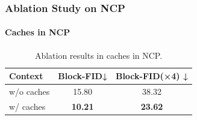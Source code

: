 \documentclass{article}
\begin{document}


\subsubsection{Ablation Study on NCP}

\paragraph{Caches in NCP}
\begin{table}
\vspace{-0.16in}
\centering
\setlength{\tabcolsep}{2pt}
\begin{tabular}{lcc}
\toprule
Context      & Block-FID↓ & Block-FID(×4) ↓ \\ 
\midrule
w/o caches & 15.80       & 38.32           \\
w/ caches  & \textbf{10.21}      & \textbf{23.62} \\
\bottomrule
\end{tabular}
\caption{Ablation results in caches in NCP.}
\label{tab:transfer}
\end{table}
\end{document}
